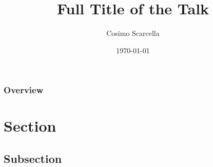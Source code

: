 \documentclass{beamer}
\title[Short title]{Full Title of the Talk} %
\author{Cosimo Scarcella} %
\institute[Unibo] %
{
Università di Bologna\\ %
\medskip

\href{http://www.cosimoscarcella.com}{www.cosimoscarcella.com}


}
\date{\today} %
\begin{document}
\begin{frame}
\titlepage %
\end{frame}

\begin{frame}
\frametitle{Overview} %
\tableofcontents %
\end{frame}



\section{Section} %

\subsection{Subsection} %

\end{document}
